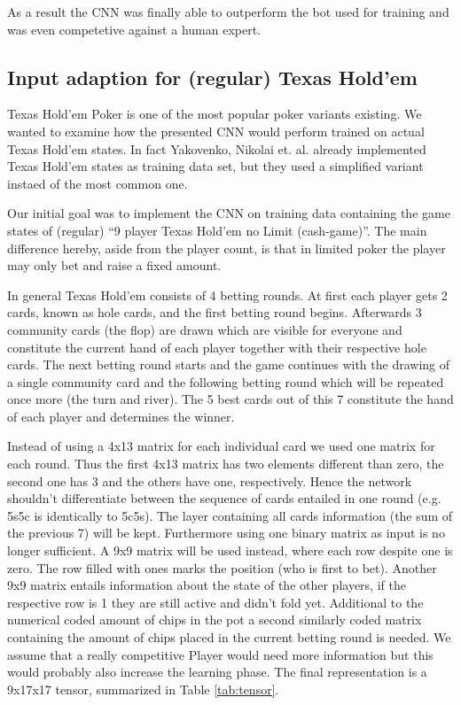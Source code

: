 \documentclass[]{report}
\begin{document}
As a result the CNN was finally able to outperform the bot used for
training and was even competetive against a human expert.

\subsection{Input adaption for (regular) Texas Hold'em \label{see:adapted_p} }

Texas Hold'em Poker is one of the most popular poker variants existing. We wanted to examine how the presented CNN would perform
trained on actual Texas Hold'em states. In fact Yakovenko, Nikolai et. al. already implemented
Texas Hold'em states as training data set, but they used a simplified variant instaed of the most common one.

Our initial goal was to implement the CNN on training data containing
the game states of (regular) ``9 player Texas Hold'em no Limit (cash-game)''.
The main difference hereby, aside from the player count, is that in
limited poker the player may only bet and raise a fixed amount.

In general Texas Hold'em consists of 4 betting rounds. At first each
player gets 2 cards, known as hole cards, and the first betting round
begins. Afterwards 3 community cards (the flop) are drawn which are
visible for everyone and constitute the current hand of each player
together with their respective hole cards. The next betting round
starts and the game continues with the drawing of a single community
card and the following betting round which will be repeated once more
(the turn and river). The 5 best cards out of this 7 constitute
the hand of each player and determines the winner.

Instead of using a 4x13 matrix for each individual card we used one
matrix for each round. Thus the first 4x13 matrix has two elements
different than zero, the second one has 3 and the others have one,
respectively. Hence the network shouldn't differentiate between the
sequence of cards entailed in one round (e.g. 5s5c is identically
to 5c5s). The layer containing all cards information (the sum of the
previous 7) will be kept. Furthermore using one binary matrix as input
is no longer sufficient. A 9x9 matrix will be used instead, where
each row despite one is zero. The row filled with ones marks
the position (who is first to bet). Another 9x9 matrix entails information
about the state of the other players, if the respective row is 1 they
are still active and didn't fold yet. Additional to the numerical
coded amount of chips in the pot a second similarly coded matrix containing
the amount of chips placed in the current betting round is needed.
We assume that a really competitive Player would need more information
but this would probably also increase the learning phase. The final
representation is a 9x17x17 tensor, summarized in Table \ref{tab:tensor}.
\end{document}
